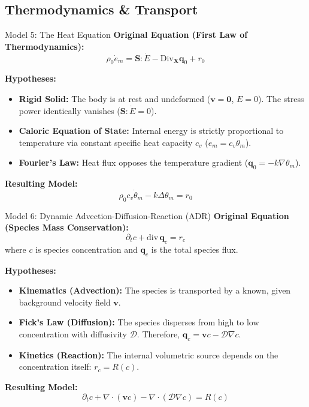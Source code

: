 \documentclass[aspectratio=169]{beamer}
\begin{document}
\subsection{Thermodynamics \& Transport}

\begin{frame}{Model 5: The Heat Equation}
    \textbf{Original Equation (First Law of Thermodynamics):}
    $$ \rho_0 \dot{e}_m = \bm{S} : \dot{E} - \text{Div}_{\bm{X}} \bm{q}_0 + r_0 $$

    \textbf{Hypotheses:}
    \begin{itemize}
        \item \textbf{Rigid Solid:} The body is at rest and undeformed ($\bm{v} = \bm{0}$, $E = 0$). The stress power identically vanishes ($\bm{S} : \dot{E} = 0$).
        \item \textbf{Caloric Equation of State:} Internal energy is strictly proportional to temperature via constant specific heat capacity $c_v$ ($e_m = c_v \theta_m$).
        \item \textbf{Fourier's Law:} Heat flux opposes the temperature gradient ($\bm{q}_0 = -k \nabla \theta_m$).
    \end{itemize}

    \textbf{Resulting Model:}
    $$ \rho_0 c_v \dot{\theta}_m - k \Delta \theta_m = r_0 $$
\end{frame}

\begin{frame}{Model 6: Dynamic Advection-Diffusion-Reaction (ADR)}
    \textbf{Original Equation (Species Mass Conservation):}
    $$ \partial_t c + \text{div} \, \bm{q}_c = r_c $$
    where $c$ is species concentration and $\bm{q}_c$ is the total species flux.

    \textbf{Hypotheses:}
    \begin{itemize}
        \item \textbf{Kinematics (Advection):} The species is transported by a known, given background velocity field $\bm{v}$.
        \item \textbf{Fick's Law (Diffusion):} The species disperses from high to low concentration with diffusivity $\mathcal{D}$. Therefore, $\bm{q}_c = \bm{v} c - \mathcal{D} \nabla c$.
        \item \textbf{Kinetics (Reaction):} The internal volumetric source depends on the concentration itself: $r_c = R(c)$.
    \end{itemize}

    \textbf{Resulting Model:}
    $$ \partial_t c + \nabla \cdot (\bm{v} c) - \nabla \cdot (\mathcal{D} \nabla c) = R(c) $$
\end{frame}
\end{document}
